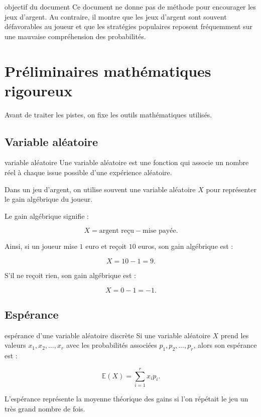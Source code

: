 \documentclass[11pt,a4paper]{article}
\newcommand{\E}{\mathbb{E}}
\begin{document}
\begin{attention}{objectif du document}
Ce document ne donne pas de méthode pour encourager les jeux d'argent. Au contraire, il montre que les jeux d'argent sont souvent défavorables au joueur et que les stratégies populaires reposent fréquemment sur une mauvaise compréhension des probabilités.
\end{attention}

\section{Préliminaires mathématiques rigoureux}

Avant de traiter les pistes, on fixe les outils mathématiques utilisés.

\subsection{Variable aléatoire}

\begin{definitionbox}{variable aléatoire}
Une variable aléatoire est une fonction qui associe un nombre réel à chaque issue possible d'une expérience aléatoire.

Dans un jeu d'argent, on utilise souvent une variable aléatoire $X$ pour représenter le gain algébrique du joueur.

Le gain algébrique signifie :

\[
X = \text{argent reçu} - \text{mise payée}.
\]

Ainsi, si un joueur mise $1$ euro et reçoit $10$ euros, son gain algébrique est :

\[
X=10-1=9.
\]

S'il ne reçoit rien, son gain algébrique est :

\[
X=0-1=-1.
\]
\end{definitionbox}

\subsection{Espérance}

\begin{definitionbox}{espérance d'une variable aléatoire discrète}
Si une variable aléatoire $X$ prend les valeurs $x_1,x_2,\dots,x_r$ avec les probabilités associées $p_1,p_2,\dots,p_r$, alors son espérance est :

\[
\E(X)=\sum_{i=1}^{r}x_i p_i.
\]

L'espérance représente la moyenne théorique des gains si l'on répétait le jeu un très grand nombre de fois.
\end{definitionbox}
\end{document}
